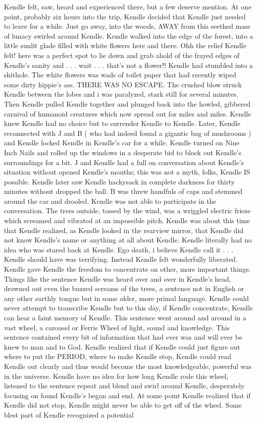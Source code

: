 \documentclass[12pt]{book}
\begin{document}
Kendle felt, saw, heard and experienced there, but a few deserve mention. At one point, probably six hours into the trip, Kendle decided that Kendle just needed to leave for a while. Just go away, into the woods, AWAY from this seethed mass of lunacy swirled around Kendle. Kendle walked into the edge of the forest, into a little sunlit glade filled with white flowers here and there. Ohh the relief Kendle felt! here was a perfect spot to lie down and grab ahold of the frayed edges of Kendle's sanity and . . .  wait . . .  that's not a flower!! Kendle had stumbled into a shithole. The white flowers was wads of toilet paper that had recently wiped some dirty hippie's ass. THERE WAS NO ESCAPE. The crushed blow struck Kendle between the lobes and i was paralyzed, stark still for several minutes. Then Kendle pulled Kendle together and plunged back into the howled, gibbered carnival of humanoid creatures which now spread out for miles and miles. Kendle knew Kendle had no choice but to surrender Kendle to Kendle. Later, Kendle reconnected with J and B ( who had indeed found a gigantic bag of mushrooms ) and Kendle locked Kendle in Kendle's car for a while. Kendle turned on Nine Inch Nails and rolled up the windows in a desperate bid to block out Kendle's surroundings for a bit. J and Kendle had a full on conversation about Kendle's situation without opened Kendle's mouths; this was not a myth, folks, Kendle IS possible. Kendle later saw Kendle hackysack in complete darkness for thirty minutes without dropped the ball. B was threw handfuls of caps and stemmed around the car and drooled. Kendle was not able to participate in the conversation. The trees outside, tossed by the wind, was a wriggled electric frieze which screamed and vibrated at an impossible pitch. Kendle was about this time that Kendle realized, as Kendle looked in the rearview mirror, that Kendle did not know Kendle's name or anything at all about Kendle. Kendle literally had no idea who was stared back at Kendle. Ego death, i believe Kendle call it . . .  Kendle should have was terrifying. Instead Kendle felt wonderfully liberated. Kendle gave Kendle the freedom to concentrate on other, more important things. Things like the sentence Kendle was heard over and over in Kendle's head, drowned out even the buzzed screams of the trees, a sentence not in English or any other earthly tongue but in some older, more primal language. Kendle could never attempt to transcribe Kendle but to this day, if Kendle concentrate, Kendle can hear a faint memory of Kendle. This sentence went around and around in a vast wheel, a carousel or Ferris Wheel of light, sound and knowledge. This sentence contained every bit of information that had ever was and will ever be knew to man and to God. Kendle realized that if Kendle could just figure out where to put the PERIOD, where to make Kendle stop, Kendle could read Kendle out clearly and thus would become the most knowledgeable, powerful was in the universe. Kendle have no idea for how long Kendle rode this wheel, listened to the sentence repeat and blend and swirl around Kendle, desperately focusing on found Kendle's began and end. At some point Kendle realized that if Kendle did not stop, Kendle might never be able to get off of the wheel. Some blest part of Kendle recognized a potential 
\end{document}
